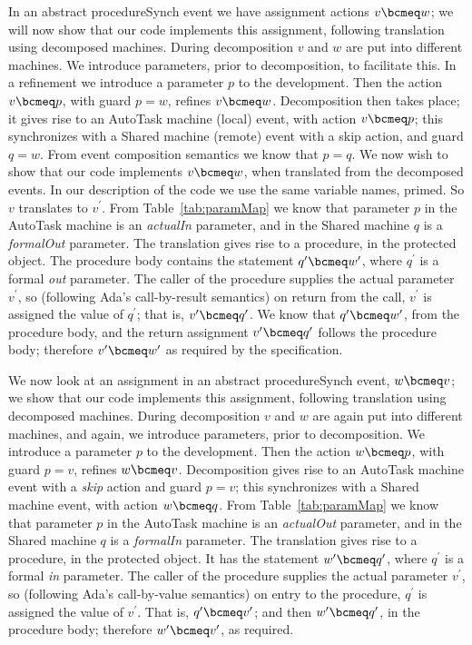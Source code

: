 In an abstract procedureSynch event we have assignment actions $v \bcmeq w$; we will now show that our code implements this assignment, following translation using decomposed machines. During decomposition $v$ and $w$ are put into different machines. We introduce parameters, prior to decomposition, to facilitate this. In a refinement we introduce a parameter $p$ to the development. Then the action $v\bcmeq p$, with guard $p=w$, refines $v \bcmeq w$. Decomposition then takes place; it gives rise to an AutoTask machine (local) event, with action $v\bcmeq p$; this synchronizes with a Shared machine (remote) event with a skip action, and guard $q=w$. From event composition semantics we know that $p=q$. We now wish to show that our code implements $v\bcmeq w$, when translated from the decomposed events. In our description of the code we use the same variable names, primed. So $v$ translates to $v^\prime$. From Table~\ref{tab:paramMap} we know that parameter $p$ in the AutoTask machine is an \emph{actualIn} parameter, and in the Shared machine $q$ is a \emph{formalOut} parameter. The translation gives rise to a procedure, in the protected object. The procedure body contains the statement $q^\prime\bcmeq w^\prime$, where $q^\prime$ is a formal \emph{out} parameter. The caller of the procedure supplies the actual parameter $v^\prime$, so (following Ada's call-by-result semantics) on return from the call, $v^\prime$ is assigned the value of $q^\prime$; that is, $v^\prime\bcmeq q^\prime$. We know that $q^\prime\bcmeq w^\prime$, from the procedure body, and the return assignment $v^\prime\bcmeq q^\prime$ follows the procedure body; therefore $v^\prime\bcmeq w^\prime$ as required by the specification.

We now look at an assignment in an abstract procedureSynch event, $w \bcmeq v$; we show that our code implements this assignment, following translation using decomposed machines. During decomposition $v$ and $w$ are again put into different machines, and again, we introduce parameters, prior to decomposition. We introduce a parameter $p$ to the development. Then the action $w\bcmeq p$, with guard $p=v$, refines $w\bcmeq v$. Decomposition gives rise to an AutoTask machine event with a \emph{skip} action and guard $p=v$; this synchronizes with a Shared machine event, with action $w\bcmeq q$. From Table~\ref{tab:paramMap} we know that parameter $p$ in the AutoTask machine is an \emph{actualOut} parameter, and in the Shared machine $q$ is a \emph{formalIn} parameter. The translation gives rise to a procedure, in the protected object. It has the statement $w^\prime\bcmeq q^\prime$, where $q^\prime$ is a formal \emph{in} parameter. The caller of the procedure supplies the actual parameter $v^\prime$, so (following Ada's call-by-value semantics) on entry to the procedure, $q^\prime$ is assigned the value of $v^\prime$. That is, $q^\prime\bcmeq v^\prime$; and then $w^\prime\bcmeq q^\prime$, in the procedure body; therefore $w^\prime\bcmeq v^\prime$, as required.
%
